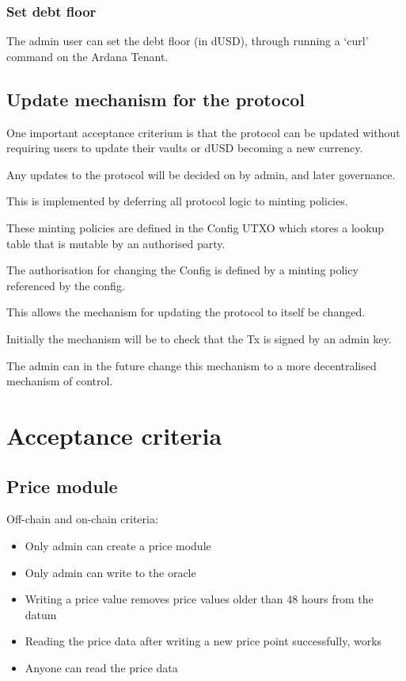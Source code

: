 \documentclass{article} %
\begin{document}
\subsubsection{Set debt floor}

The admin user can set the debt floor (in dUSD), through running a `curl'
command on the Ardana Tenant.

\subsection{Update mechanism for the protocol}

One important acceptance criterium is that the protocol can be updated without
requiring users to update their vaults or dUSD becoming a new currency.

Any updates to the protocol will be decided on by admin, and later governance.

This is implemented by deferring all protocol logic to minting policies.

These minting policies are defined in the Config UTXO which stores a lookup table that is mutable by an authorised party.

The authorisation for changing the Config is defined by a minting policy referenced by the config.

This allows the mechanism for updating the protocol to itself be changed.

Initially the mechanism will be to check that the Tx is signed by an admin key.

The admin can in the future change this mechanism to a more decentralised mechanism of control.

\section{Acceptance criteria}

\subsection{Price module}

Off-chain and on-chain criteria:
\begin{itemize}
  \item Only admin can create a price module
  \item Only admin can write to the oracle
  \item Writing a price value removes price values older than 48 hours from the
    datum
  \item Reading the price data after writing a new price point successfully,
    works
  \item Anyone can read the price data
\end{itemize}
\end{document}
